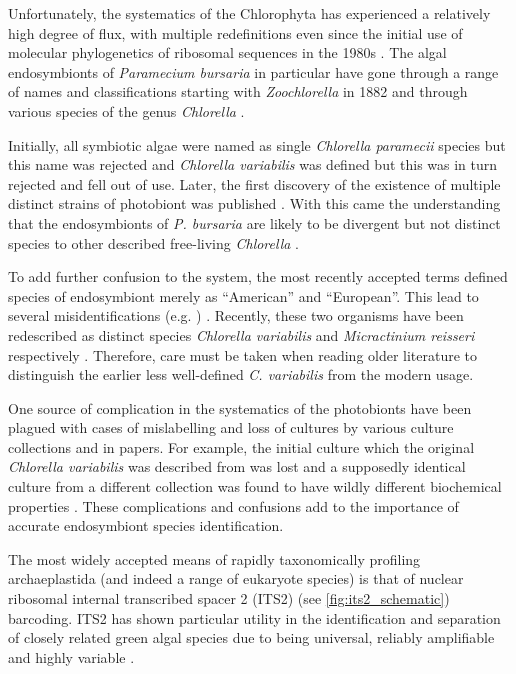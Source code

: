 Unfortunately, the systematics of the Chlorophyta has experienced a relatively
high degree of flux, with multiple redefinitions even since the initial 
use of molecular phylogenetics of ribosomal sequences \citep{Hori1985,Gunderson1987}
in the 1980s \citep{Leliaert2012,Hoshina2010}.  The algal endosymbionts of
\textit{Paramecium bursaria} in particular have gone through a range of 
names and classifications starting with \textit{Zoochlorella} in 1882 and
through various species of the genus \textit{Chlorella} \citep{Hoshina2010}.

Initially, all symbiotic algae were named as single \textit{Chlorella paramecii}
species but this name was rejected and \textit{Chlorella variabilis} 
was defined \citep{shihira1965chlorella} but this was in turn rejected and fell out of use.
Later, the first discovery of the existence of multiple distinct strains of photobiont was published \citep{Douglas1986}.
With this came the understanding that the endosymbionts of \textit{P. bursaria}
are likely to be divergent but not distinct species to other described
free-living \textit{Chlorella} \citep{Hoshina2010}.

To add further confusion to the system, the most recently
accepted terms defined species of endosymbiont merely 
as ``American'' and ``European''.  This lead to several
misidentifications (e.g. \citep{Kodama2007}) \citep{Hoshina2010}.
Recently, these two organisms have been redescribed as
distinct species \textit{Chlorella variabilis} and
\textit{Micractinium reisseri} respectively \citep{Hoshina2010}.
Therefore, care must be taken when reading older literature
to distinguish the earlier less well-defined \textit{C. variabilis}
from the modern usage.

One source of complication in the systematics of the photobionts have been
plagued with cases of mislabelling and loss of cultures
by various culture collections and in papers. For example, the initial culture
which the original \textit{Chlorella variabilis} was described from was lost
and a supposedly identical culture from a different collection
was found to have wildly different biochemical properties \citep{Hoshina2010}.
These complications and confusions add to the importance
of accurate endosymbiont species identification. 


The most widely accepted means of rapidly taxonomically profiling
archaeplastida (and indeed a range of eukaryote species) is that of 
nuclear ribosomal internal transcribed spacer 2 (ITS2) (see \cref{fig:its2_schematic}) barcoding. 
ITS2 has shown particular utility in the identification and separation
of closely related green algal species \citep{Buchheim2011} due to being
universal, reliably amplifiable and highly variable \citep{Hershkovitz1996}.

